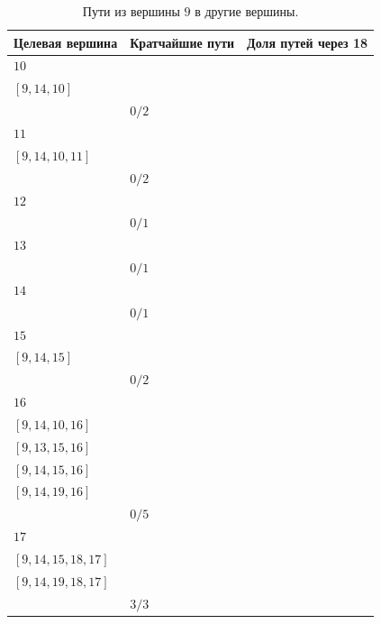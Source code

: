 \documentclass[12pt, a4paper]{extarticle}
\begin{document}
\begin{table}[h!]
    \caption{Пути из вершины $9$ в другие вершины.}
    \label{tbl:10-9}
    \begin{tabularx}{\textwidth}{|X|X|X|}
        \hline 
        Целевая вершина & Кратчайшие пути & Доля путей через 18 \\
        \hline 
        $10$ & \begin{tabular}{@{}l@{}} $[9, 6, 10]$ \\  $[9, 14, 10]$ \\ \end{tabular} & $0/2$ \\
        \hline
        $11$ & \begin{tabular}{@{}l@{}} $[9, 6, 10, 11]$ \\  $[9, 14, 10, 11]$ \\ \end{tabular} & $0/2$ \\
        \hline
        $12$ & \begin{tabular}{@{}l@{}} $[9, 13, 12]$ \\ \end{tabular} & $0/1$ \\
        \hline
        $13$ & \begin{tabular}{@{}l@{}} $[9, 13]$ \\ \end{tabular} & $0/1$ \\
        \hline
        $14$ & \begin{tabular}{@{}l@{}} $[9, 14]$ \\ \end{tabular} & $0/1$ \\
        \hline
        $15$ & \begin{tabular}{@{}l@{}} $[9, 13, 15]$ \\  $[9, 14, 15]$ \\ \end{tabular} & $0/2$ \\
        \hline
        $16$ & \begin{tabular}{@{}l@{}} $[9, 6, 10, 16]$ \\  $[9, 14, 10, 16]$ \\  $[9, 13, 15, 16]$ \\  $[9, 14, 15, 16]$ \\  $[9, 14, 19, 16]$ \\ \end{tabular} & $0/5$ \\
        \hline
        $17$ & \begin{tabular}{@{}l@{}} $[9, 13, 15, 18, 17]$ \\  $[9, 14, 15, 18, 17]$ \\  $[9, 14, 19, 18, 17]$ \\ \end{tabular} & $3/3$ \\

\end{tabularx}
\end{table}
\end{document}
